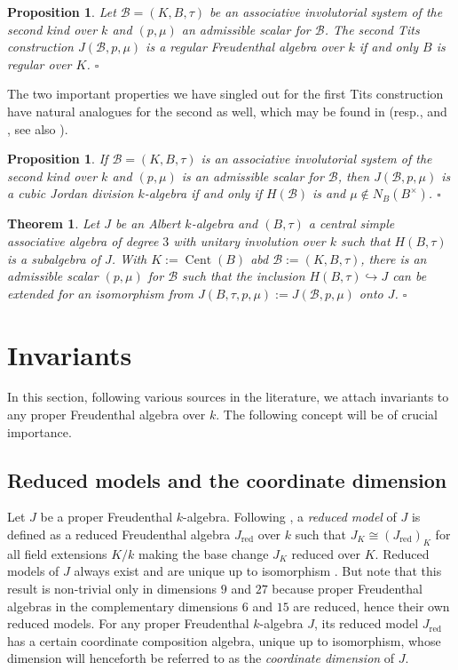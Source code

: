 \documentclass{amsart}
\newtheorem{thm}[equation]{Theorem}
\newtheorem{prop}[equation]{Proposition}
\theoremstyle{definition} %
\theoremstyle{remark} %
\DeclareMathOperator{\Cent}{Cent}
\DeclareMathOperator{\red}{red}
\newcommand{\msB}{\mathscr{B}}
\renewcommand{\:}{\colon\,}
\numberwithin{equation}{section}
\begin{document}
\begin{prop}
Let $\msB = (K,B,\tau)$ be an associative involutorial system of the second kind over $k$ and $(p,\mu)$ an admissible scalar for $\msB$. The second Tits construction $J(\msB,p,\mu)$ is a regular Freudenthal algebra over $k$ if and only $B$ is regular over $K$. \hfill $\square$    
\end{prop}

The two important properties we have singled out for the first Tits construction have natural analogues for the second as well, which may be found in \cite[Thm.~46.10]{MR4806163} (resp., \cite[Exc.~IX.12.5]{MR0251099} and \cite[Thm.~9]{MR0271181}, see also \cite[Thm.~A4.4]{garibaldi2025solutionsexercisesbookalbert}).

\begin{prop} \label{p.DISETI}
If $\msB = (K,B,\tau)$ is an associative involutorial system of the second kind over $k$ and $(p,\mu)$ is an admissible scalar for $\msB$, then $J(\msB,p,\mu)$ is a cubic Jordan division $k$-algebra if and only if $H(\msB)$ is and $\mu \notin N_B(B^\times)$. \hfill $\square$
\end{prop}

\begin{thm} \label{t.ETSETI}
Let $J$ be an Albert $k$-algebra and $(B,\tau)$ a central simple associative algebra of degree $3$ with unitary involution over $k$ such that $H(B,\tau)$ is a subalgebra of $J$. With $K := \Cent(B)$ abd $\msB := (K,B,\tau)$, there is an admissible scalar $(p,\mu)$ for $\msB$ such that the inclusion $H(B,\tau) \hookrightarrow J$ can be extended for an isomorphism from $J(B,\tau,p,\mu) := J(\msB,p,\mu)$ onto $J$. \hfill $\square$   
\end{thm}

\section{Invariants} \label{s.INVAR} In this section, following various sources in the literature, we attach invariants to any proper Freudenthal algebra over $k$. The following concept will be of crucial importance.

\subsection{Reduced models and the coordinate dimension} \label{ss.REDMOD} Let $J$ be a proper Freudenthal $k$-algebra. Following \cite{MR1417849}, a \emph{reduced model} of $J$ is defined as a reduced Freudenthal algebra $J_{\red}$ over $k$ such that $J_K \cong (J_{\red})_K$ for all field extensions $K/k$ making the base change $J_K$ reduced over $K$. Reduced models of $J$ always exist and are unique up to isomorphism \cite[Thm.~2.8]{MR1417849}. But note that this result is non-trivial only in dimensions $9$ and $27$ because proper Freudenthal algebras in the complementary dimensions $6$ and $15$ are reduced, hence their own reduced models. For any proper Freudenthal $k$-algebra $J$, its reduced model $J_{\red}$ has  a certain coordinate composition algebra, unique up to isomorphism, whose dimension will henceforth be referred to as the \emph{coordinate dimension} of $J$. 
\end{document}
